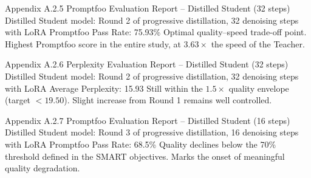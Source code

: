\documentclass[11pt, a4paper]{article}
\begin{document}
\annexcover%
    {Appendix A.2.5}%
    {Promptfoo Evaluation Report – Distilled Student (32 steps)}%
    {Distilled Student model: Round 2 of progressive distillation, 32 denoising steps with LoRA}%
    {Promptfoo Pass Rate: 75.93\%}%
    {Optimal quality--speed trade-off point. Highest Promptfoo score in the entire study, at $3.63\times$ the speed of the Teacher.}

\annexcover%
    {Appendix A.2.6}%
    {Perplexity Evaluation Report – Distilled Student (32 steps)}%
    {Distilled Student model: Round 2 of progressive distillation, 32 denoising steps with LoRA}%
    {Average Perplexity: 15.93}%
    {Still within the $1.5\times$ quality envelope (target $< 19.50$). Slight increase from Round 1 remains well controlled.}

\annexcover%
    {Appendix A.2.7}%
    {Promptfoo Evaluation Report – Distilled Student (16 steps)}%
    {Distilled Student model: Round 3 of progressive distillation, 16 denoising steps with LoRA}%
    {Promptfoo Pass Rate: 68.5\%}%
    {Quality declines below the 70\% threshold defined in the SMART objectives. Marks the onset of meaningful quality degradation.}
\end{document}
